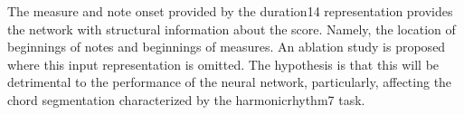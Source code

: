 
The measure and note onset provided by the \gls{duration14}
representation provides the network with structural
information about the score. Namely, the location of
beginnings of notes and beginnings of measures. An ablation
study is proposed where this input representation is
omitted. The hypothesis is that this will be detrimental to
the performance of the neural network, particularly,
affecting the chord segmentation characterized by the
\gls{harmonicrhythm7} task.
